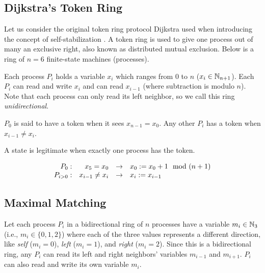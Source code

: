 \subsection{Dijkstra's Token Ring}
Let us consider the original token ring protocol Dijkstra used when introducing the concept of self-stabilization \cite{dij}.
A token ring is used to give one process out of many an exclusive right, also known as distributed mutual exclusion.
Below is a ring of $n=6$ finite-state machines (processes).


Each process $P_i$ holds a variable $x_i$ which ranges from $0$ to $n$ ($x_i\in\mathbb{N}_{n+1}$).
Each $P_i$ can read and write $x_i$ and can read $x_{i-1}$ (where subtraction is modulo $n$).
Note that each process can only read its left neighbor, so we call this ring {\em unidirectional}.

$P_0$ is said to have a token when it sees $x_{n-1} = x_0$.
Any other $P_i$ has a token when $x_{i-1} \neq x_i$.

A state is legitimate when exactly one process has the token.

\[
\begin{array}{rrcl}
 P_0: & x_{5} = x_0 & \to & x_0 := x_0 + 1 \mod (n+1)
\\ P_{i>0}: & x_{i-1} \neq x_i & \to & x_i := x_{i-1}
\end{array}
\]

\subsection{Maximal Matching}

Let each process $P_i$ in a bidirectional ring of $n$ processes have a variable $m_i\in \mathbb{N}_3$ (i.e., $m_i\in \{0,1,2\}$) where each of the three values represents a different direction, like {\it self} ($m_i=0$), {\it left} ($m_i=1$), and {\it right} ($m_i=2$).
Since this is a bidirectional ring, any $P_i$ can read its left and right neighbors' variables $m_{i-1}$ and $m_{i+1}$.
$P_i$ can also read and write its own variable $m_i$.

